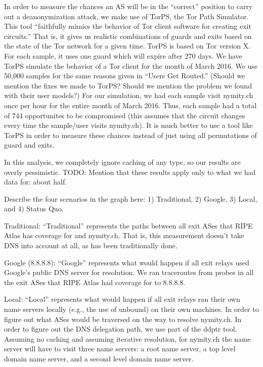 In order to measure the chances an AS will be in the ``correct'' position to carry out a
deanonymization attack, we make use of TorPS, the Tor Path Simulator. This tool 
``faithfully mimics the behavior of Tor client software for creating exit circuits.''
That is, it gives us realistic combinations of guards and exits based on the state of the 
Tor network for a given time. TorPS is based on Tor version X. For each sample, it uses 
one guard which will expire after 270 days. We have TorPS simulate the behavior of a Tor 
client for the month of March 2016. We use 50,000 samples for the same reasons given in
``Users Get Routed.'' (Should we mention the fixes we made to TorPS? Should we mention 
the problem we found with their user models?) For our simulation, we had each sample 
visit nymity.ch once per hour for the entire month of March 2016. Thus, each sample had 
a total of 744 opportunites to be compromised (this assumes that the circuit changes 
every time the sample/user visits nymity.ch). It is much better to use a tool like TorPS 
in order to measure these chances instead of just using all permutations of guard and 
exits.

In this analysis, we completely ignore caching of any type, so our results are overly 
pessimistic. TODO: Mention that these results apply only to what we had data for: about 
half.

Describe the four scenarios in the graph here: 1) Traditional, 2) Google, 3) Local, and 
4) Status Quo.

Traditional: ``Traditional'' represents the paths between all exit ASes that RIPE Atlas 
has coverage for and nymity.ch. That is, this measurement doesn't take DNS into account 
at all, as has been traditionally done.

Google (8.8.8.8): ``Google'' represents what would happen if all exit relays used 
Google's public DNS server for resolution. We ran traceroutes from probes in all the exit 
ASes that RIPE Atlas had coverage for to 8.8.8.8.

Local: ``Local'' represents what would happen if all exit relays ran their own name 
servers locally (e.g., the use of unbound) on their own machines. In order to figure out 
what ASes would be traversed on the way to resolve nymity.ch. In order to figure out the 
DNS delegation path, we use part of the ddptr tool. Assuming no caching and assuming 
iterative resolution, for nymity.ch the name server will have to visit three name servers:
a root name server, a top level domain name server, and a second level domain name server. 


